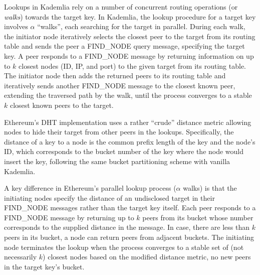 Lookups in Kademlia rely on a number of concurrent routing operations (or \emph{walks}) towards the target key.
In Kademlia, the lookup procedure for a target key involves $\alpha$ ``walks'', each searching for the target in parallel. During each walk, the initiator node iteratively selects the closest peer to the target from its routing table and sends the peer a FIND\_NODE query message, specifying the target key. A peer responds to a FIND\_NODE message by returning information on up to $k$ closest nodes (\ie ID, IP, and port) to the given target from its routing table. The initiator node then adds the returned peers to its routing table and iteratively sends another FIND\_NODE message to the closest known peer, extending the traversed path by the walk, until the process converges to a stable $k$ closest known peers to the target.


Ethereum's DHT implementation uses a rather ``crude'' distance metric allowing nodes to hide their target from other peers in the lookups. Specifically, the distance of a key to a node is the common prefix length of the key and the node's ID, which corresponds to the bucket number of the key where the node would insert the key, following the same bucket partitioning scheme with vanilla Kademlia.

A key difference in Ethereum's parallel lookup process (\ie $\alpha$ walks) is that the initiating nodes specify the distance of an undisclosed target in their FIND\_NODE messages rather than the target key itself. Each peer responds to a FIND\_NODE message by returning up to $k$ peers from its bucket whose number corresponds to the supplied distance in the message. In case, there are less than $k$ peers in its bucket, a node can return peers from adjacent buckets. The initiating node terminates the lookup when the process converges to a stable set of (not necessarily $k$) closest nodes based on the modified distance metric, \ie no new peers in the target key's bucket.


